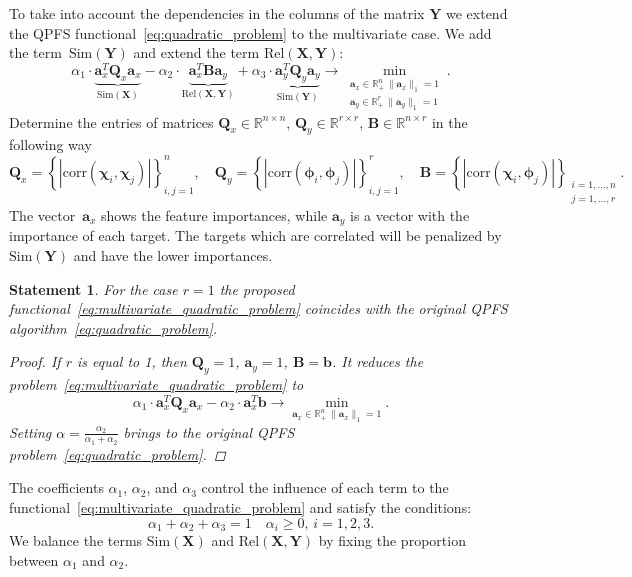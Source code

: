 \documentclass[12pt,twoside]{article}
\newtheorem{statement}{Statement}
\newcommand{\ba}{\mathbf{a}}
\newcommand{\bb}{\mathbf{b}}
\newcommand{\bY}{\mathbf{Y}}
\newcommand{\bX}{\mathbf{X}}
\newcommand{\bB}{\mathbf{B}}
\newcommand{\bQ}{\mathbf{Q}}
\newcommand{\bbR}{\mathbb{R}}
\newcommand{\bchi}{\boldsymbol{\chi}}
\newcommand{\bphi}{\boldsymbol{\phi}}
\begin{document}
To take into account the dependencies in the columns of the matrix $\bY$ we extend the QPFS functional~\eqref{eq:quadratic_problem} to the multivariate case. 
We add the term~$\text{Sim}(\bY)$ and extend the term $\text{Rel}(\bX, \bY)$:
\begin{equation}
	\alpha_1 \cdot \underbrace{\ba_x^{T} \bQ_x \ba_x}_{\text{Sim}(\bX)} - \alpha_2 \cdot \underbrace{\ba_x^{T} \bB \ba_y}_{\text{Rel}(\bX, \bY)} + \alpha_3 \cdot \underbrace{\ba_y^{T} \bQ_y \ba_y}_{\text{Sim}(\bY)} \rightarrow \min_{\substack{\ba_x \in \bbR^n_+ \, \|\ba_x\|_1=1 \\ \ba_y \in \bbR^r _+ \, \|\ba_y\|_1=1}}.
	\label{eq:multivariate_quadratic_problem}
\end{equation}
Determine the entries of matrices $\bQ_x \in \bbR^{n \times n}$, $\bQ_y \in \bbR^{r \times r}$, $\bB \in \bbR^{n \times r}$ in the following way
\begin{equation*}
	\bQ_x = \left\{ \left| \text{corr}(\bchi_i, \bchi_j) \right| \right\}_{i,j=1}^n, \quad 
	\bQ_y = \left\{ \left| \text{corr}(\bphi_i, \bphi_j) \right| \right\}_{i,j=1}^r, \quad
	\bB =  \left\{ \left| \text{corr}(\bchi_i, \bphi_j) \right| \right\}_{\substack{i=1, \dots, n \\ j=1, \dots, r}}.
\end{equation*}
The vector~$\ba_x$ shows the feature importances, while $\ba_y$ is a vector with the importance of each target. 
The targets which are correlated will be penalized by $\text{Sim} (\bY)$ and have the lower importances.  

\begin{statement}
For the case $r=1$ the proposed functional~\eqref{eq:multivariate_quadratic_problem} coincides with the original QPFS algorithm~\eqref{eq:quadratic_problem}.

\begin{proof}
	If $r$ is equal to 1, then $\bQ_y = 1$, $\ba_y = 1$, $\bB = \bb$. It reduces the problem~\eqref{eq:multivariate_quadratic_problem} to 
	\[
	\alpha_1 \cdot \ba_x^{T} \bQ_x \ba_x - \alpha_2 \cdot \ba_x^{T} \bb \rightarrow \min_{\ba_x \in \bbR^n_+ \, \|\ba_x\|_1=1} .
	\]
	Setting $\alpha = \frac{\alpha_2}{\alpha_1 + \alpha_2}$ brings to the original QPFS problem~\eqref{eq:quadratic_problem}.
\end{proof}
\end{statement}

The coefficients $\alpha_1$, $\alpha_2$, and $\alpha_3$ control the influence of each term to the functional~\eqref{eq:multivariate_quadratic_problem} and satisfy the conditions:
\[
\alpha_1 + \alpha_2 + \alpha_3 = 1 \quad \alpha_i \geq 0, \, i = 1, 2, 3.
\] 
We balance the terms $\text{Sim}(\bX)$ and $\text{Rel}(\bX, \bY)$ by fixing the proportion between $\alpha_1$ and $\alpha_2$.
\end{document}
